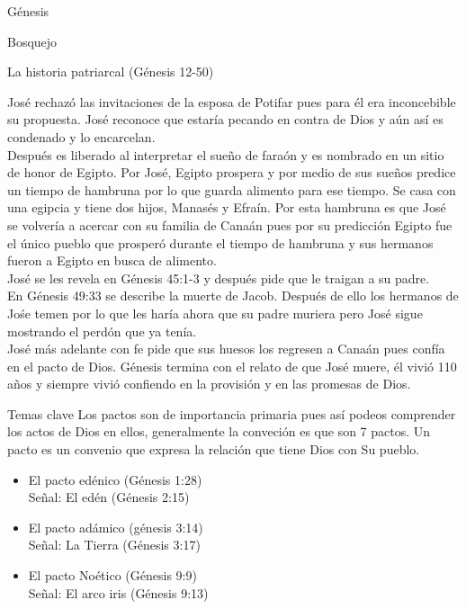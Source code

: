 \begin{section}{Génesis}
\begin{subsection}{Bosquejo}
\begin{subsubsection}{La historia patriarcal (Génesis 12-50)}
\begin{enumerate}
	José rechazó las invitaciones de la esposa de Potifar pues para él era inconcebible su propuesta. José reconoce que estaría pecando en contra de Dios y aún así es condenado y lo encarcelan.\\
	Después es liberado al interpretar el sueño de faraón y es nombrado en un sitio de honor de Egipto. Por José, Egipto prospera y por medio de sus sueños predice un tiempo de hambruna por lo que guarda alimento para ese tiempo. Se casa con una egipcia y tiene dos hijos, Manasés y Efraín. Por esta hambruna es que José se volvería a acercar con su familia de Canaán pues por su predicción Egipto fue el único pueblo que prosperó durante el tiempo de hambruna y sus hermanos fueron a Egipto en busca de alimento.\\
	José se les revela en Génesis 45:1-3 y después pide que le traigan a su padre.\\
	En Génesis 49:33 se describe la muerte de Jacob. Después de ello los hermanos de Jośe temen por lo que les haría ahora que su padre muriera pero José sigue mostrando el perdón que ya tenía.\\
	José más adelante con fe pide que sus huesos los regresen a Canaán pues confía en el pacto de Dios. Génesis termina con el relato de que José muere, él vivió 110 años y siempre vivió confiendo en la provisión y en las promesas de Dios.

			\end{enumerate}

		\end{subsubsection}
	\end{subsection}
	\begin{subsection}{Temas clave}
 Los pactos son de importancia primaria pues así podeos comprender los actos de Dios en ellos, generalmente la conveción es que son 7 pactos. Un pacto es un convenio que expresa la relación que tiene Dios con Su pueblo.
			 \begin{itemize}

				 \item El pacto edénico (Génesis 1:28)\\
				Señal: El edén (Génesis 2:15)

			\item	El pacto adámico (génesis 3:14)\\
				Señal: La Tierra (Génesis 3:17)

			\item	El pacto Noético (Génesis 9:9)\\
				Señal: El arco iris (Génesis 9:13)


\end{itemize}
\end{subsection}
\end{section}
